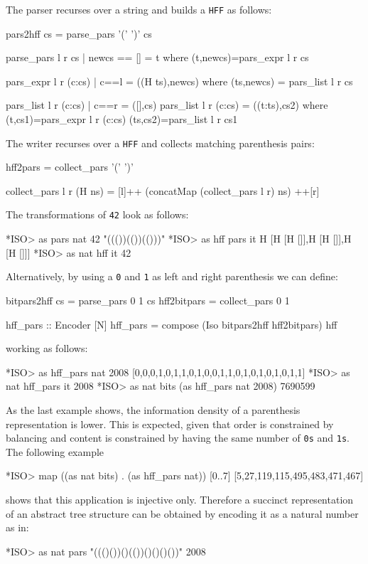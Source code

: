 \documentclass[]{INCLUDES/llncs}
\begin{document}
The parser recurses over a string and builds a {\tt HFF} as follows:
\begin{code}
pars2hff cs = parse_pars '(' ')' cs

parse_pars l r cs | newcs == [] = t where
  (t,newcs)=pars_expr l r cs

pars_expr l r (c:cs) | c==l = ((H ts),newcs) where 
  (ts,newcs) = pars_list l r cs
     
  pars_list l r (c:cs) | c==r = ([],cs)
  pars_list l r (c:cs) = ((t:ts),cs2) where 
    (t,cs1)=pars_expr l r (c:cs)
    (ts,cs2)=pars_list l r cs1
\end{code}
The writer recurses over a {\tt HFF} and collects
matching parenthesis pairs:
\begin{code}
hff2pars = collect_pars '(' ')'

collect_pars l r (H ns) =
  [l]++ 
    (concatMap (collect_pars l r) ns)
  ++[r] 
\end{code}
The transformations of {\tt 42} look as follows:
\begin{codex}
*ISO> as pars nat 42
"((())(())(()))"
*ISO> as hff pars it
H [H [H []],H [H []],H [H []]]
*ISO> as nat hff it
42
\end{codex}
Alternatively, by using a {\tt 0} and {\tt 1} as left and right parenthesis we
can define:
\begin{code}
bitpars2hff cs = parse_pars 0 1 cs
hff2bitpars = collect_pars 0 1

hff_pars :: Encoder [N]
hff_pars = compose (Iso bitpars2hff hff2bitpars) hff
\end{code}
working as follows:
\begin{codex}
*ISO> as hff_pars nat 2008
[0,0,0,1,0,1,1,0,1,0,0,1,1,0,1,0,1,0,1,0,1,1]
*ISO> as nat hff_pars it
2008
*ISO> as nat bits (as hff_pars nat 2008)
7690599
\end{codex}
As the last example shows, the information density of
a parenthesis representation is lower. This is expected,
given that order is constrained by balancing and content is
constrained by having the same number of {\tt 0s} and {\tt 1s}.
The following example
\begin{codex}
*ISO> map ((as nat bits) .  (as hff_pars nat)) [0..7]
[5,27,119,115,495,483,471,467]
\end{codex}
shows that this application is injective only.
Therefore a succinct representation of an abstract tree
structure can be obtained by encoding it as a
natural number as in:
\begin{codex}
*ISO> as nat pars "((()())()(())()()()())"
2008
\end{codex}
\end{document}
